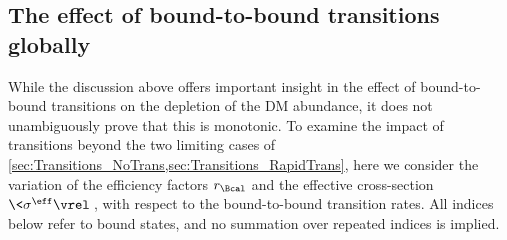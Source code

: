 \documentclass[preprint,5p,twocolumn]{elsarticle}
\begin{document}
\subsection{The effect of bound-to-bound transitions globally \label{sec:Transitions_General}}

While the discussion above offers important insight in the effect of bound-to-bound transitions on the depletion of the DM abundance, it does not unambiguously prove that this is monotonic. To examine the impact of transitions beyond the two limiting cases of \cref{sec:Transitions_NoTrans,sec:Transitions_RapidTrans}, here we consider the variation of the efficiency factors $r_{\Bcal}$ and the effective cross-section $\<\sigma^{\eff}\vrel\>$, with respect to the bound-to-bound transition rates.
All indices below refer to bound states, and no summation over repeated indices is implied.
\end{document}
